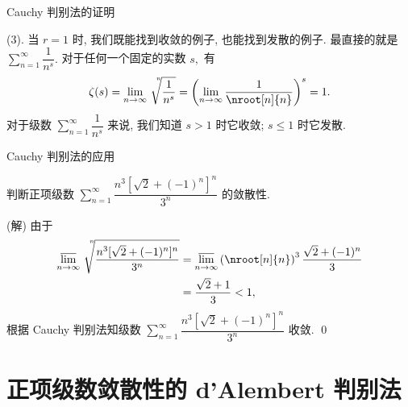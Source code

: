 
\begin{frame}{Cauchy 判别法的证明}

(3). 当 $r = 1$ 时, 我们既能找到收敛的例子, 也能找到发散的例子.
\pause
最直接的就是 $\sum\limits_{n=1}^{\infty} \dfrac{1}{n^s}.$ 对于任何一个固定的实数 $s,$ 有
\[\zeta(s) = \lim\limits_{n\to\infty} \sqrt[\leftroot{-7}\uproot{15}n]{\dfrac{1}{n^s}} = \left( \lim\limits_{n\to\infty} \dfrac{1}{\nroot[n]{n}} \right)^s = 1.\]
对于级数 $\sum\limits_{n=1}^{\infty} \dfrac{1}{n^s}$ 来说, 我们知道 $s > 1$ 时它收敛; $s \leqslant 1$ 时它发散.

\end{frame}


\begin{frame}{Cauchy 判别法的应用}

\begin{eg}
\begin{center}
判断正项级数 $\sum\limits_{n=1}^{\infty} \dfrac{n^3[\sqrt{2} + (-1)^n]^n}{3^n}$ 的敛散性.
\end{center}
\end{eg}

\pause

\startproof[bg=yellow, fg=red](解)
由于
\begin{align*}
\varlimsup_{n\to\infty} \sqrt[\leftroot{-7}\uproot{20}n]{\dfrac{n^3[\sqrt{2} + (-1)^n]^n}{3^n}} & = \varlimsup_{n\to\infty} \left(\nroot[n]{n}\right)^3 \dfrac{\sqrt{2} + (-1)^n}{3} \\
& = \dfrac{\sqrt{2} + 1}{3} < 1,
\end{align*}
根据 Cauchy 判别法知级数 $\sum\limits_{n=1}^{\infty} \dfrac{n^3[\sqrt{2} + (-1)^n]^n}{3^n}$ 收敛.
\qed

\end{frame}


\section[d'Alembert\\判别法]{正项级数敛散性的 d'Alembert 判别法}


